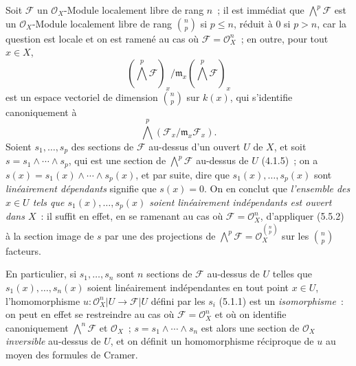 \begin{env}[5.5.4]
\label{0.5.5.4-fr}
Soit $\mathcal{F}$ un $\mathcal{O}_X$-Module localement libre de rang $n$~;
il est immédiat que $\bigwedge^p\mathcal{F}$ est un $\mathcal{O}_X$-Module
localement libre de rang $\binom{n}{p}$ si $p\leq n$, réduit à $0$ si $p>n$,
car la question est locale et on est ramené au cas où
$\mathcal{F}=\mathcal{O}_X^n$~; en outre, pour tout $x\in X$,
\[
  (\bigwedge^p\mathcal{F})_x/
  \mathfrak{m}_x(\bigwedge^p\mathcal{F})_x
\]
est un espace vectoriel de dimension $\binom{n}{p}$ sur $k(x)$, qui
s'identifie canoniquement à
\[
  \bigwedge^p(\mathcal{F}_x/\mathfrak{m}_x\mathcal{F}_x).
\]
Soient
$s_1,\ldots,s_p$ des sections de $\mathcal{F}$ au-dessus d'un ouvert $U$ de $X$, et
soit $s=s_1\wedge\cdots\wedge s_p$, qui est une section de
$\bigwedge^p\mathcal{F}$ au-dessus de $U$ (4.1.5)~; on a
$s(x)=s_1(x)\wedge\cdots\wedge s_p(x)$, et par suite, dire que
$s_1(x),\ldots,s_p(x)$ sont \emph{linéairement dépendants} signifie que
$s(x)=0$. On en conclut que \emph{l'ensemble des $x\in U$ tels que
$s_1(x),\ldots,s_p(x)$ soient linéairement indépendants est ouvert dans
$X$}~: il suffit en effet, en se ramenant au cas où
$\mathcal{F}=\mathcal{O}_X^n$, d'appliquer (5.5.2) à la section image de $s$
par une des projections de
$\bigwedge^p\mathcal{F}=\mathcal{O}_X^{\binom{n}{p}}$ sur les
$\binom{n}{p}$ facteurs.

En particulier, si $s_1,\ldots,s_n$ sont $n$ sections de $\mathcal{F}$
au-dessus de $U$ telles que $s_1(x),\ldots,s_n(x)$ soient linéairement
indépendantes en tout point $x\in U$, l'homomorphisme
$u:\mathcal{O}_X^n|U\to\mathcal{F}|U$ défini par les $s_i$ (5.1.1) est un
\emph{isomorphisme}~: on peut en effet se restreindre au cas où
$\mathcal{F}=\mathcal{O}_X^n$ et où on identifie canoniquement
$\bigwedge^n\mathcal{F}$ et $\mathcal{O}_X$~;
$s=s_1\wedge\cdots\wedge s_n$ est alors une section de $\mathcal{O}_X$
\emph{inversible} au-dessus de $U$, et on définit un homomorphisme réciproque
de $u$ au moyen des formules de Cramer.
\end{env}

